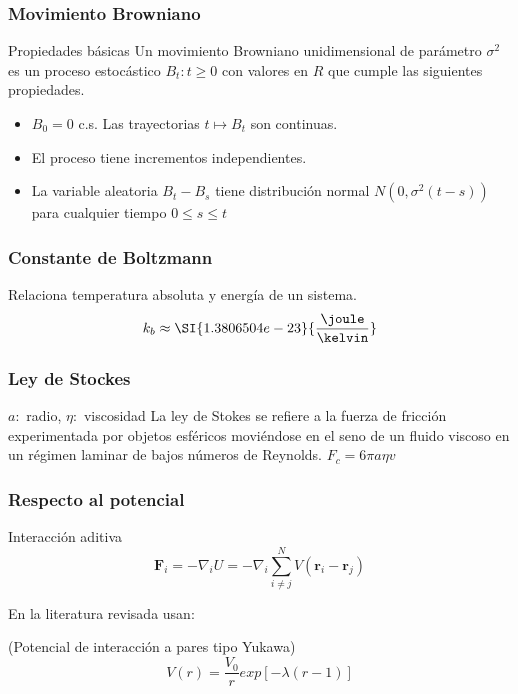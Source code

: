 \begin{frame}
    \frametitle{Movimiento Browniano}
  \begin{alertblock}{Propiedades básicas}
        Un movimiento Browniano unidimensional de parámetro $\sigma^2$ es
        un proceso estocástico ${B_t : t ≥ 0}$ con valores en $R$ que cumple las siguientes
        propiedades.
      \begin{itemize}
        \item $B_0=0$  c.s.
          Las trayectorias $ t \mapsto B_t$ son continuas.
        \item
          El proceso tiene incrementos independientes.
        \item
          La variable aleatoria $B_t-B_s$ tiene distribución normal $N(0,\sigma^2(t-s))$ para cualquier tiempo
          $0\leq s\leq t$
     \end{itemize}
    \end{alertblock}
\end{frame}
\begin{frame}
   \frametitle{Constante de Boltzmann}
    \begin{alertblock}{Relaciona temperatura absoluta y energía de un sistema.}
      $$k_b\approx \SI{1.3806504e-23}{\frac{\joule}{\kelvin}}$$
    \end{alertblock}
\end{frame}
\begin{frame}
   \frametitle{Ley de Stockes}
    \begin{exampleblock}{$a:$ radio, $\eta:$ viscosidad}
      La ley de Stokes se refiere a la fuerza de fricción experimentada por objetos esféricos moviéndose en el
      seno    de un fluido viscoso en un régimen laminar de bajos números de Reynolds.
      $F_c=6\pi a \eta v$
   \end{exampleblock}
\end{frame}
\begin{frame}
   \frametitle{Respecto al potencial}
    \begin{block}{Interacción aditiva}
      $$
       \mathbf{F}_i= -\nabla_i U=-\nabla_i \sum_{i\neq j}^N V(\mathbf{r}_i-\mathbf{r}_j)
      $$
    \end{block}
    En la literatura revisada usan:
    \begin{exampleblock}{(Potencial de interacción a pares tipo Yukawa)}
        $$
          V(r)=\frac{V_0}{r} exp[-\lambda(r-1)]
        $$
    \end{exampleblock}
\end{frame}